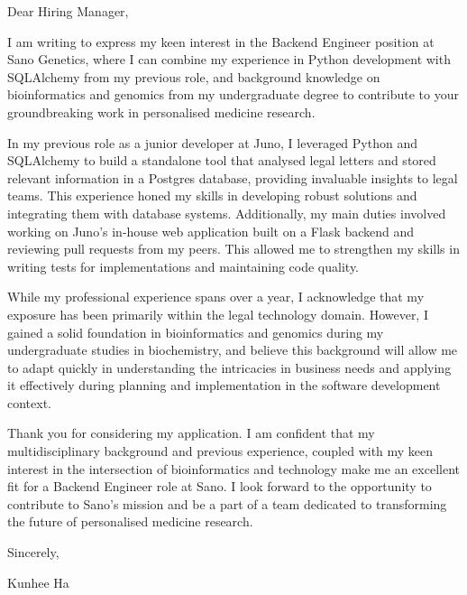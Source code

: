\documentclass{article}
\begin{document}
\color{BodyGrey}
Dear Hiring Manager,
\vspace{15pt}

I am writing to express my keen interest in the Backend Engineer position at Sano Genetics, where I can combine my experience in Python development with SQLAlchemy from my previous role, and background knowledge on bioinformatics and genomics from my undergraduate degree to contribute to your groundbreaking work in personalised medicine research. 
\vspace{15pt}


In my previous role as a junior developer at Juno, I leveraged Python and SQLAlchemy to build a standalone tool that analysed legal letters and stored relevant information in a Postgres database, providing invaluable insights to legal teams. This experience honed my skills in developing robust solutions and integrating them with database systems. Additionally, my main duties involved working on Juno's in-house web application built on a Flask backend and reviewing pull requests from my peers. This allowed me to strengthen my skills in writing tests for implementations and maintaining code quality.
\vspace{15pt}


While my professional experience spans over a year, I acknowledge that my exposure has been primarily within the legal technology domain. However, I gained a solid foundation in bioinformatics and genomics during my undergraduate studies in biochemistry, and believe this background will allow me to adapt quickly in understanding the intricacies in business needs and applying it effectively during planning and implementation in the software development context.
\vspace{15pt}


Thank you for considering my application. I am confident that my multidisciplinary background and previous experience, coupled with my keen interest in the intersection of bioinformatics and technology make me an excellent fit for a Backend Engineer role at Sano. I look forward to the opportunity to contribute to Sano's mission and be a part of a team dedicated to transforming the future of personalised medicine research.
\vspace{15pt}


Sincerely,

Kunhee Ha
\end{document}

